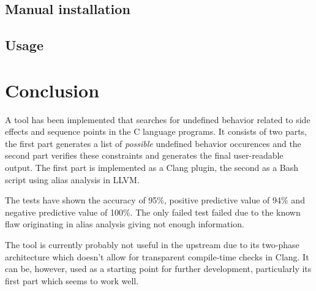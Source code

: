 \section{Manual installation}
\section{Usage}
\chapter{Conclusion}
A tool has been implemented that searches for undefined behavior related to side effects and sequence points in the C language programs. It consists of two parts, the first part generates a list of \emph{possible} undefined behavior occurences and the second part verifies these constraints and generates the final user-readable output. The first part is implemented as a Clang plugin, the second as a Bash script using alias analysis in LLVM.

The tests have shown the accuracy of 95\%, positive predictive value of 94\% and negative predictive value of 100\%. The only failed test failed due to the known flaw  originating in alias analysis giving not enough information.

The tool is currently probably not useful in the upstream due to its two-phase architecture which doesn't allow for transparent compile-time checks in Clang. It can be, however, used as a starting point for further development, particularly its first part which seems to work well.

